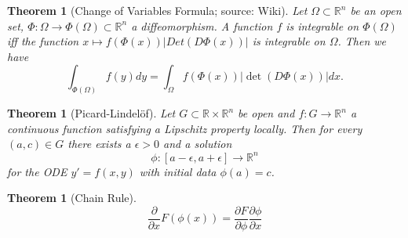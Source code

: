 \documentclass[12pt,a4paper]{article}
\newtheorem{thm}[definition]{Theorem}
\newcommand{\Rn}{\mathbb{R}^n}
\begin{document}
\begin{thm}[Change of Variables Formula; source: Wiki]
Let $\Omega \subset \Rn$ be an open set, $\Phi: \Omega \rightarrow \Phi(\Omega)\subset\Rn$ a diffeomorphism. A function $f$ is integrable on $\Phi(\Omega)$ iff the function $x \mapsto f(\Phi(x))\lvert Det(D\Phi(x)) \rvert$ is integrable on $\Omega$. Then we have
\begin{equation}
\int_{\Phi(\Omega)} f(y) dy = \int_{\Omega} f(\Phi(x))\lvert \det(D\Phi(x)) \rvert dx.
\end{equation}
\end{thm}

\begin{thm}[Picard-Lindelöf]
Let $G\subset \mathbb{R}\times\Rn$ be open and $f:G\rightarrow \Rn$ a continuous function satisfying a Lipschitz property locally. Then for every $(a,c)\in G$ there exists a $\epsilon >0$ and a solution
\begin{equation}
\phi:[a-\epsilon,a+\epsilon]\rightarrow\Rn
\end{equation}
for the ODE $y'=f(x,y)$ with initial data $\phi(a)=c$.
\end{thm}

\begin{thm}[Chain Rule]
\begin{equation}
\frac{\partial}{\partial x} F(\phi(x)) = \frac{\partial F}{\partial \phi} \frac{\partial \phi}{\partial x}
\end{equation}
\end{thm}
\end{document}
